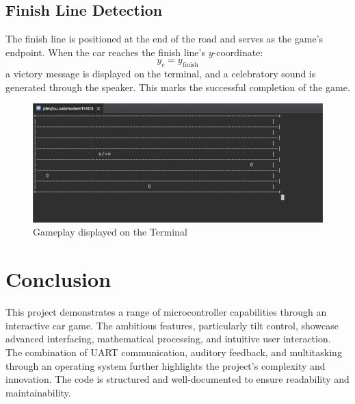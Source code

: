 \documentclass[conference]{IEEEtran}
\begin{document}
\subsection{Finish Line Detection}
The finish line is positioned at the end of the road and serves as the game's endpoint. When the car reaches the finish line's $y$-coordinate:
\begin{equation}
y_c = y_{\text{finish}}
\end{equation}
a victory message is displayed on the terminal, and a celebratory sound is generated through the speaker. This marks the successful completion of the game.
\begin{figure}
    \centering
    \includegraphics[width=1\linewidth]{Gameplay.pdf}
    \caption{Gameplay displayed on the Terminal}
    \label{fig:game_menu}
\end{figure}


\section{Conclusion}
This project demonstrates a range of microcontroller capabilities through an interactive car game. The ambitious features, particularly tilt control, showcase advanced interfacing, mathematical processing, and intuitive user interaction. The combination of UART communication, auditory feedback, and multitasking through an operating system further highlights the project’s complexity and innovation. The code is structured and well-documented to ensure readability and maintainability.
\end{document}
